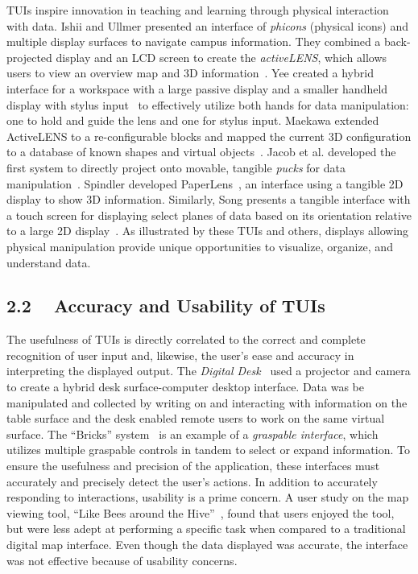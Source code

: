 \documentclass{article}
\begin{document}
TUIs inspire innovation in teaching and learning through physical
interaction with data.  Ishii and Ullmer presented an interface of
{\em phicons} (physical icons) and multiple display surfaces to
navigate campus information.  They combined a back-projected display
and an LCD screen to create the {\em activeLENS}, which allows users
to view an overview map and 3D information~\cite{Ishii97tangiblebits}.
%
Yee created a hybrid interface for a workspace with a large passive
display and a smaller handheld display with stylus input~\cite{642613}
to effectively utilize both hands for data manipulation: one to hold
and guide the lens and one for stylus input.
%
Maekawa extended ActiveLENS to a re-configurable blocks and mapped the
current 3D configuration to a database of known shapes and virtual
objects~\cite{1517704}.
%
Jacob et al. developed the first system to directly project onto
movable, tangible {\em pucks} for data manipulation~\cite{Jacob01atangible}.
%
Spindler developed PaperLens~\cite{Spindler:2009:PAM:1731903.1731920},
an interface using a tangible 2D display to show 3D information.
%
Similarly, Song presents a tangible interface with a touch screen for
displaying select planes of data based on its orientation relative to
a large 2D display~\cite{Song:2011:WEA:1978942.1979140}.
%
As illustrated by these TUIs and others, displays allowing physical
manipulation provide unique opportunities to visualize, organize,
and understand data.

\subsection{2.2 ~ Accuracy and Usability of TUIs}

The usefulness of TUIs is directly correlated to the correct and
complete recognition of user input and, likewise, the user's ease and
accuracy in interpreting the displayed output. 
%
The \emph{Digital Desk}~\cite{159630} used a projector and camera to
create a hybrid desk surface-computer desktop interface.  Data was be
manipulated and collected by writing on and interacting with
information on the table surface and the desk enabled remote users to
work on the same virtual surface.
%
The ``Bricks'' system~\cite{223964} is an example of a {\em graspable
  interface}, which utilizes multiple graspable controls in tandem to
select or expand information.  To ensure the usefulness and precision
of the application, these interfaces must accurately and precisely
detect the user's actions.
%
In addition to accurately responding to interactions, usability is a
prime concern.  A user study on the map viewing tool, ``Like Bees
around the Hive''~\cite{1518991}, found that users enjoyed the tool,
but were less adept at performing a specific task when compared to a
traditional digital map interface.  Even though the data displayed was
accurate, the interface was not effective because of usability
concerns.  
\end{document}
